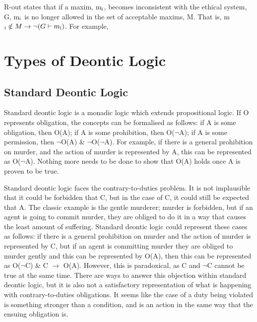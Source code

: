\documentclass{l4proj}
\begin{document}
R-out states that if a maxim, m\( \textsubscript{i} \), becomes inconsistent with the ethical system, G, m\( \textsubscript{i} \) is no longer allowed in the set of acceptable maxims, M. That is, m\( \textsubscript{i}  \notin M \rightarrow \neg(G \vdash m \textsubscript{i}) \). For example, %

\section{Types of Deontic Logic}

\subsection{Standard Deontic Logic}
Standard deontic logic is a monadic logic which extends propositional logic. If O represents obligation, the concepts can be formalised as follows: if A is some obligation, then O(A); if A is some prohibition, then O(\( \neg \)A); if A is some permission, then \( \neg \)O(A) \& \( \neg \)O(\( \neg \)A). For example, if there is a general prohibition on murder, and the action of murder is represented by A, this can be represented as O(\( \neg \)A). Nothing more needs to be done to show that O(A) holds once A is proven to be true. 

Standard deontic logic faces the contrary-to-duties problem. It is not implausible that it could be forbidden that C, but in the case of C, it could still be expected that A. The classic example is the gentle murderer; murder is forbidden, but if an agent is going to commit murder, they are obliged to do it in a way that causes the least amount of suffering. Standard deontic logic could represent these cases as follows: if there is a general prohibition on murder and the action of murder is represented by C, but if an agent is committing murder they are obliged to murder gently and this can be represented by O(A), then this can be represented as O(\( \neg \)C) \& C \( \to \) O(A). However, this is paradoxical, as C and \( \neg \)C cannot be true at the same time. There are ways to answer this objection within standard deontic logic, but it is also not a satisfactory representation of what is happening with contrary-to-duties obligations. It seems like the case of a duty being violated is something stronger than a condition, and is an action in the same way that the ensuing obligation is. 
\end{document}
